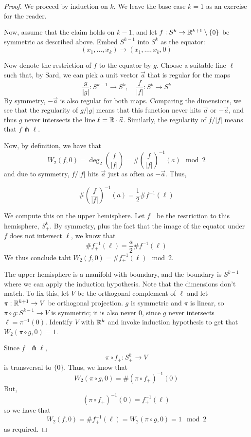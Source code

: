 \begin{proof}
    We proceed by induction on $k$. We leave the base case $k = 1$ as an exercise for the reader.

    Now, assume that the claim holds on $k - 1$, and let $f: S^k \to \mathbb{R}^{k+1}\setminus \{0\}$ be symmetric as described above. Embed $S^{k-1}$ into $S^k$ as the equator:
    \[(x_1,\ldots,x_k) \to (x_1,\ldots,x_k,0)\]
    
    Now denote the restriction of $f$ to the equator by $g$. Choose a suitable line $\ell$ such that, by Sard, we can pick a unit vector $\vec{a}$ that is regular for the maps
    \[\frac{g}{|g|}: S^{k-1} \to S^k, \quad \frac{f}{|f|}: S^k \to S^k\]
    By symmetry, $-\vec{a}$ is also regular for both maps. Comparing the dimensions, we see that the regularity of $g/|g|$ means that this function never hits $\vec{a}$ or $-\vec{a}$, and thus $g$ never intersects the line $\ell = \mathbb{R} \cdot \vec{a}$. Similarly, the regularity of $f/|f|$ means that $f \pitchfork \ell$. 

    Now, by definition, we have that 
    \[W_2(f,0) = \deg_2\left(\frac{f}{|f|}\right) = \#\left(\frac{f}{|f|}\right)^{-1}(a) \mod 2\]
    and due to symmetry, $f/|f|$ hits $\vec{a}$ just as often as $-\vec{a}$. Thus, 

    \[\#\left(\frac{f}{|f|}\right)^{-1}(a) = \frac{1}{2}\#f^{-1}(\ell)\]

    We compute this on the upper hemisphere. Let $f_+$ be the restriction to this hemisphere, $S_+^k$. By symmetry, plus the fact that the image of the equator under $f$ does not intersect $\ell$, we know that 
    \[\#f_+^{-1}(\ell) = \frac{a}{2}\#f^{-1}(\ell)\]
    We thus conclude taht $W_2(f,0) = \#f_+^{-1}(\ell) \mod 2$.

    The upper hemisphere is a manifold with boundary, and the boundary is $S^{k-1}$ where we can apply the induction hypothesis. Note that the dimensions don't match. To fix this, let $V$ be the orthogonal complement of $\ell$ and let $\pi: \mathbb{R}^{k+1} \to V$ be orthogonal projection. $g$ is symmetric and $\pi$ is linear, so $\pi \circ g: S^{k-1} \to V$ is symmetric; it is also never 0, since $g$ never intersects $\ell = \pi^{-1}(0)$. Identify $V$ with $\mathbb{R}^k$ and invoke induction hypothesis to get that $W_2(\pi \circ g, 0) = 1$. 

    Since $f_+ \pitchfork \ell$, 
    \[\pi \circ f_+: S_+^k \to V\]
    is transversal to $\{0\}$. Thus, we know that 
    \[W_2(\pi \circ g, 0) = \#(\pi \circ f_+)^{-1}(0)\]
    But,
    \[(\pi \circ f_+)^{-1}(0) = f_+^{-1}(\ell)\]
    so we have that 
    \[W_2(f,0) = \#f_+^{-1}(\ell) = W_2(\pi \circ g,0) = 1 \mod 2\]
    as required. 
\end{proof}

